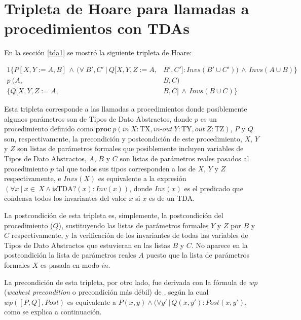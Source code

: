 \chapter{Tripleta de Hoare para llamadas a procedimientos con TDAs}
\label{derivhoare}

En la sección \ref{tda1} se mostró la siguiente tripleta de Hoare:

\begin{alignat}{1}
  \{ P[X,Y:=A,B]\, \land \, (\forall\ B', C'\ |\ Q[X,Y,Z:=A,&B',C'] : Invs(B' \cup C'))\, \land \, Invs(A \cup B)   \} \nonumber \\
  p\  (A,&B,C) \label{eqn:tdatriple2} \\ 
  \{ Q[X,Y,Z:=A,&B,C]\, \land \, Invs(B \cup C)\} \nonumber
\end{alignat}

Esta tripleta corresponde a las llamadas a procedimientos donde 
posiblemente algunos parámetros son de Tipos de Dato Abstractos,
donde $p$ es un procedimiento definido como
$\textbf{proc}\ p (in\ X : \textrm{TX}, in\textrm{-}out\ Y : \textrm{TY}, out\ Z : \textrm{TZ})$, $P$ y $Q$ son, respectivamente, la precondición y postcondición de este procedimiento, $X$, $Y$ y $Z$ son listas de parámetros formales que posiblemente incluyen
variables de Tipos de Dato Abstractos, $A$, $B$ y $C$ son listas de parámetros reales pasados al procedimiento $p$ tal que todos sus tipos corresponden a los de $X$, $Y$ y $Z$ respectivamente, e $Invs(X)$ es equivalente a la expresión $(\forall x\ |\ x \in\ X \land \textrm{isTDA?}(x) : Inv(x) )$, donde $Inv(x)$ es el predicado que condensa todos los
invariantes del valor $x$ si $x$ es de un TDA.

La postcondición de esta tripleta es, simplemente, la postcondición del procedimiento ($Q$), sustituyendo las listas de parámetros formales $Y$ y $Z$ por $B$ y $C$ respectivamente, y la verificación de los invariantes de todas las variables de Tipos de Dato Abstractos que estuvieran en las listas $B$ y $C$. No aparece en la postcondición la lista de parámetros reales $A$ puesto que la lista de parámetros formales $X$ es pasada en modo $in$.

La precondición de esta tripleta, por otro lado, fue derivada con la fórmula de $wp$ (\textit{weakest precondition} o precondición más débil) de \cite{flaviani}, según la cual $wp([P, Q], Post)$ es equivalente a $P (x,y) \land (\forall y'\,|\,Q(x, y') : Post (x, y')$, como se explica a continuación.

